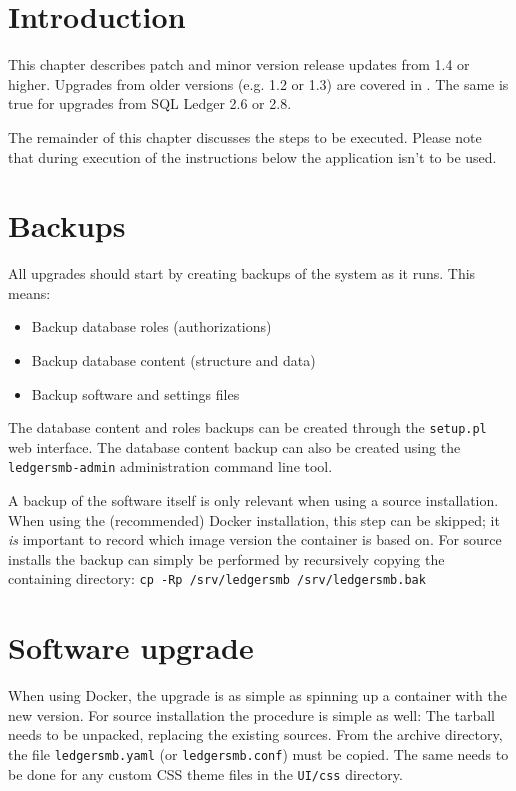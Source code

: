 \section{Introduction}
\label{sec-updates-introduction}

This chapter describes patch and minor version release updates from 1.4 or higher.
Upgrades from older versions (e.g. 1.2 or 1.3) are covered in .
The same is true for upgrades from SQL Ledger 2.6 or 2.8.

The remainder of this chapter discusses the steps to be executed. Please note that during execution of the instructions below the application isn't to be used.

\section{Backups}
\label{sec-updates-backups}

All upgrades should start by creating backups of the system as it runs.  This means:

\begin{itemize}
\item Backup database roles (authorizations)
\item Backup database content (structure and data)
\item Backup software and settings files
\end{itemize}

The database content and roles backups can be created through the \texttt{setup.pl} web interface.
The database content backup can also be created using the \texttt{ledgersmb-admin} administration
command line tool.

A backup of the software itself is only relevant when using a source installation. When using
the (recommended) Docker installation, this step can be skipped; it \textit{is} important to
record which image version the container is based on. For source installs the backup can simply
be performed by recursively copying the containing directory: 
\texttt{cp -Rp /srv/ledgersmb /srv/ledgersmb.bak}

\section{Software upgrade}
\label{sec-updates-software-upgrades}

When using Docker, the upgrade is as simple as spinning up a container with the new version.
For source installation the procedure is simple as well: The tarball needs to be unpacked,
replacing the existing sources.  From the archive directory, the file \texttt{ledgersmb.yaml}
(or \texttt{ledgersmb.conf}) must be copied.  The same needs to be done for any custom CSS
theme files in the \texttt{UI/css} directory.

